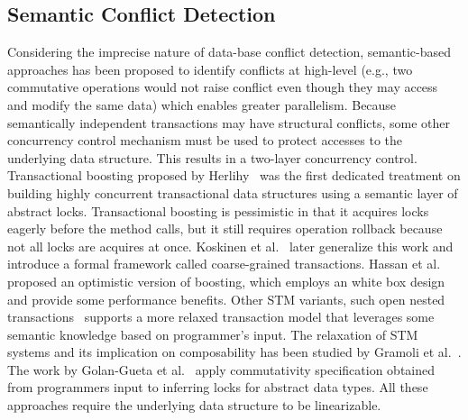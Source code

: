 \documentclass[10pt,conference,compsocconf]{IEEEtran}
\begin{document}
\subsection{Semantic Conflict Detection}
Considering the imprecise nature of data-base conflict detection, semantic-based approaches has been proposed to identify conflicts at high-level (e.g., two commutative operations would not raise conflict even though they may access and modify the same data) which enables greater parallelism.
Because semantically independent transactions may have structural conflicts, some other concurrency control mechanism must be used to protect accesses to the underlying data structure.
This results in a two-layer concurrency control.
Transactional boosting proposed by Herlihy~\cite{herlihy2008transactional} was the first dedicated treatment on building highly concurrent transactional data structures using a semantic layer of abstract locks. 
Transactional boosting is pessimistic in that it acquires locks eagerly before the method calls, but it still requires operation rollback because not all locks are acquires at once.
Koskinen et al.~\cite{koskinen2010coarse} later generalize this work and introduce a formal framework called coarse-grained transactions.
Hassan et al.~\cite{hassan2014developing} proposed an optimistic version of boosting, which employs an white box design and provide some performance benefits.
Other STM variants, such open nested transactions~\cite{ni2007open} supports a more relaxed transaction model that leverages some semantic knowledge based on programmer's input.
The relaxation of STM systems and its implication on composability has been studied by Gramoli et al.~\cite{gramoli2013composing}.
The work by Golan-Gueta et al.~\cite{golan2015automatic} apply commutativity specification obtained from programmers input to inferring locks for abstract data types.
All these approaches require the underlying data structure to be linearizable.
\end{document}
